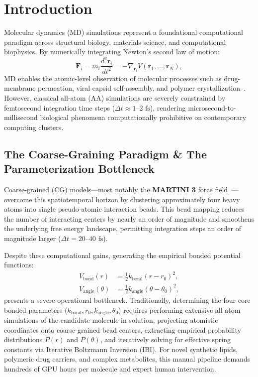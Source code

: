 \documentclass[11pt,a4paper]{article}
\begin{document}
\section{Introduction}
\label{sec:intro}

Molecular dynamics (MD) simulations represent a foundational computational paradigm across structural biology, materials science, and computational biophysics. By numerically integrating Newton's second law of motion:
\begin{equation}
\mathbf{F}_i = m_i \frac{d^2 \mathbf{r}_i}{dt^2} = -\nabla_{\mathbf{r}_i} V(\mathbf{r}_1, \dots, \mathbf{r}_N),
\label{eq:newton}
\end{equation}
MD enables the atomic-level observation of molecular processes such as drug-membrane permeation, viral capsid self-assembly, and polymer crystallization~\cite{souza2021martini3,tuckerman2010statistical}. However, classical all-atom (AA) simulations are severely constrained by femtosecond integration time steps ($\Delta t \approx 1\text{--}2\text{ fs}$), rendering microsecond-to-millisecond biological phenomena computationally prohibitive on contemporary computing clusters.

\subsection{The Coarse-Graining Paradigm \& The Parameterization Bottleneck}
Coarse-grained (CG) models---most notably the \textbf{MARTINI 3} force field~\cite{souza2021martini3}---overcome this spatiotemporal horizon by clustering approximately four heavy atoms into single pseudo-atomic interaction beads. This bead mapping reduces the number of interacting centers by nearly an order of magnitude and smoothens the underlying free energy landscape, permitting integration steps an order of magnitude larger ($\Delta t = 20\text{--}40\text{ fs}$).

Despite these computational gains, generating the empirical bonded potential functions:
\begin{align}
V_{\text{bond}}(r) &= \frac{1}{2} k_{\text{bond}} (r - r_0)^2, \label{eq:vbond}\\
V_{\text{angle}}(\theta) &= \frac{1}{2} k_{\text{angle}} (\theta - \theta_0)^2, \label{eq:vangle}
\end{align}
presents a severe operational bottleneck. Traditionally, determining the four core bonded parameters ($k_{\text{bond}}, r_0, k_{\text{angle}}, \theta_0$) requires performing extensive all-atom simulations of the candidate molecule in solution, projecting atomistic coordinates onto coarse-grained bead centers, extracting empirical probability distributions $P(r)$ and $P(\theta)$, and iteratively solving for effective spring constants via Iterative Boltzmann Inversion (IBI). For novel synthetic lipids, polymeric drug carriers, and complex metabolites, this manual pipeline demands hundreds of GPU hours per molecule and expert human intervention.
\end{document}
